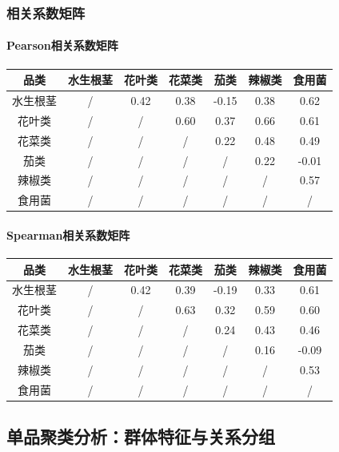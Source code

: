 \documentclass{MathNoteCN}
\begin{document}
\subsubsection{相关系数矩阵} 
\paragraph{Pearson相关系数矩阵}
\begin{table}[H]
\centering
\begin{tabular}{c c c c c c c}
\toprule
品类 & 水生根茎 & 花叶类 & 花菜类 & 茄类 & 辣椒类 & 食用菌 \\
\midrule
水生根茎 & / & 0.42 & 0.38 & -0.15 & 0.38 & 0.62 \\
花叶类 & / & / & 0.60 & 0.37 & 0.66 & 0.61 \\
花菜类 & / & / & / & 0.22 & 0.48 & 0.49 \\
茄类 & / & / & / & / & 0.22 & -0.01 \\
辣椒类 & / & / & / & / & / & 0.57 \\
食用菌 & / & / & / & / & / & / \\
\bottomrule
\end{tabular}
\end{table}

\paragraph{Spearman相关系数矩阵}
\begin{table}[H]
\centering
\begin{tabular}{c c c c c c c}
\toprule
品类 & 水生根茎 & 花叶类 & 花菜类 & 茄类 & 辣椒类 & 食用菌 \\
\midrule
水生根茎 & / & 0.42 & 0.39 & -0.19 & 0.33 & 0.61 \\
花叶类 & / & / & 0.63 & 0.32 & 0.59 & 0.60 \\
花菜类 & / & / & / & 0.24 & 0.43 & 0.46 \\
茄类 & / & / & / & / & 0.16 & -0.09 \\
辣椒类 & / & / & / & / & / & 0.53 \\
食用菌 & / & / & / & / & / & / \\
\bottomrule
\end{tabular}
\end{table}


\subsection{单品聚类分析：群体特征与关系分组}
\end{document}
